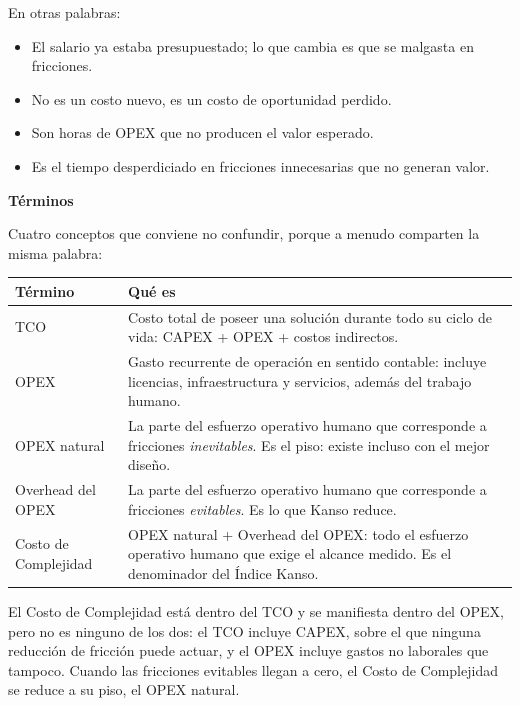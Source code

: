En otras palabras:

\begin{itemize}
    \item El salario ya estaba presupuestado; lo que cambia es que se malgasta en fricciones.
    \item No es un costo nuevo, es un costo de oportunidad perdido.
    \item Son horas de OPEX que no producen el valor esperado.
    \item Es el tiempo desperdiciado en fricciones innecesarias que no generan valor.
\end{itemize}

{\textbf{Términos}}

Cuatro conceptos que conviene no confundir, porque a menudo comparten la misma palabra:

\begin{table}[h]
\centering
\small
\begin{tabular}{|p{3.4cm}|p{10.4cm}|}
\hline
\textbf{Término} & \textbf{Qué es} \\ \hline
TCO & Costo total de poseer una solución durante todo su ciclo de vida: CAPEX + OPEX + costos indirectos. \\ \hline
OPEX & Gasto recurrente de operación en sentido contable: incluye licencias, infraestructura y servicios, además del trabajo humano. \\ \hline
OPEX natural & La parte del esfuerzo operativo humano que corresponde a fricciones \textit{inevitables}. Es el piso: existe incluso con el mejor diseño. \\ \hline
Overhead del OPEX & La parte del esfuerzo operativo humano que corresponde a fricciones \textit{evitables}. Es lo que Kanso reduce. \\ \hline
Costo de Complejidad & OPEX natural + Overhead del OPEX: todo el esfuerzo operativo humano que exige el alcance medido. Es el denominador del Índice Kanso. \\ \hline
\end{tabular}
\end{table}

El Costo de Complejidad está dentro del TCO y se manifiesta dentro del OPEX, pero no es ninguno de
los dos: el TCO incluye CAPEX, sobre el que ninguna reducción de fricción puede actuar, y el OPEX
incluye gastos no laborales que tampoco. Cuando las fricciones evitables llegan a cero, el Costo de
Complejidad se reduce a su piso, el OPEX natural.

\vspace{1em}

